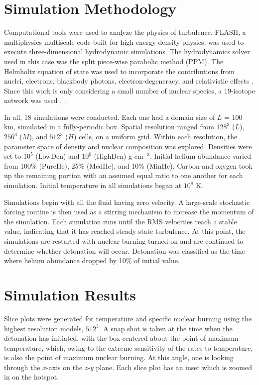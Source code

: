 \section{Simulation Methodology}

Computational tools were used to analyze the physics of turbulence. FLASH, a multiphysics multiscale code built for high-energy density physics, was used to execute three-dimensional hydrodynamic simulations. The hydrodynamics solver used in this case was the split piece-wise parabolic method (PPM). The Helmholtz equation of state was used to incorporate the contributions from nuclei, electrons, blackbody photons, electron-degeneracy, and relativistic effects \cite{timmeswoosley92}. Since this work is only considering a small number of nuclear species, a 19-isotope network was used \cite{weaveretal78}, \cite{timmes99}.

In all, 18 simulations were conducted. Each one had a domain size of $L$ = 100 km, simulated in a fully-periodic box. Spatial resolution ranged from $128^3$ ($L$), $256^3$ ($M$), and $512^3$ ($H$) cells, on a uniform grid. Within each resolution, the parameter space of density and nuclear composition was explored. Densities were set to $10^5$ (LowDen) and $10^6$ (HighDen) g cm$^{-3}$. Initial helium abundance varied from 100\% (PureHe), 25\% (MedHe), and 10\% (MinHe). Carbon and oxygen took up the remaining portion with an assumed equal ratio to one another for each simulation. Initial temperature in all simulations began at $10^8$ K. 

Simulations begin with all the fluid having zero velocity. A large-scale stochastic forcing routine is then used as a stirring mechanism to increase the momentum of the simulation. Each simulation runs until the RMS velocities reach a stable value, indicating that it has reached steady-state turbulence. At this point, the simulations are restarted with nuclear burning turned on and are continued to determine whether detonation will occur. Detonation was classified as the time where helium abundance dropped by 10\% of initial value.

\section{Simulation Results}

Slice plots were generated for temperature and specific nuclear burning using the highest resolution models, $512^3$. A snap shot is taken at the time when the detonation has initiated, with the box centered about the point of maximum temperature, which, owing to the extreme sensitivity of the rates to temperature, is also the point of maximum nuclear burning. At this angle, one is looking through the $x$-axis on the $z$-$y$ plane. Each slice plot has an inset which is zoomed in on the hotspot.

